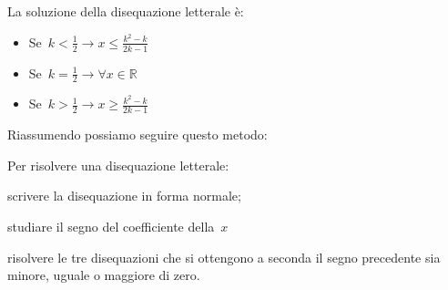 La soluzione della disequazione letterale è:

\begin{itemize}
 \item Se~$k < \frac{1}{2} \rightarrow x \le \frac{k^2 - k}{2 k - 1}$
 \item Se~$k = \frac{1}{2} \rightarrow \forall x \in \mathbb{R}$
 \item Se~$k > \frac{1}{2} \rightarrow x \ge \frac{k^2 - k}{2 k - 1}$
\end{itemize}

Riassumendo possiamo seguire questo metodo:

\begin{procedura}
 Per risolvere una disequazione letterale:
\begin{enumeratea}
 \item scrivere la disequazione in forma normale;
 \item studiare il segno del coefficiente della~$x$
 \item risolvere le tre disequazioni che si ottengono a seconda il segno 
  precedente sia minore, uguale o maggiore di zero.
\end{enumeratea}
\end{procedura}






